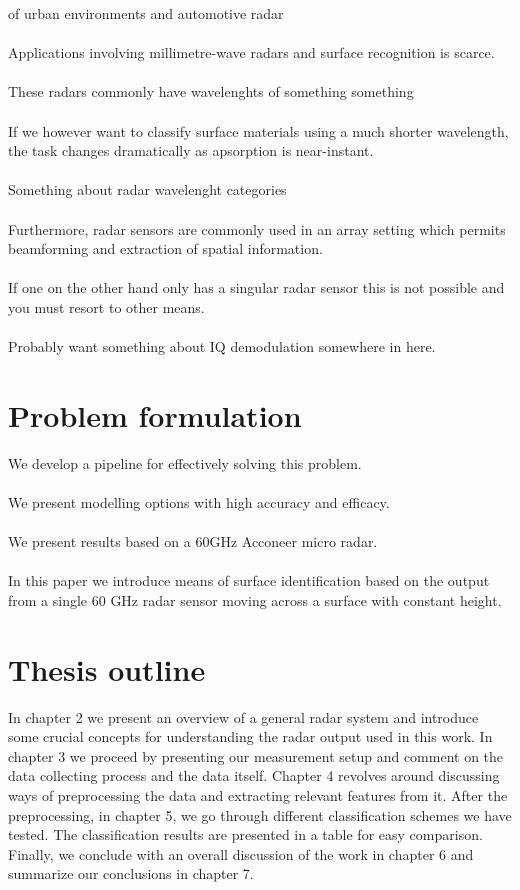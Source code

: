  of urban environments and automotive radar 
\\ \\
Applications involving millimetre-wave radars and surface recognition is scarce.  
\\ \\
These radars commonly have wavelenghts of something something
\\ \\
If we however want to classify surface materials using a much shorter wavelength, the task changes dramatically as apsorption is near-instant. 
\\ \\
Something about radar wavelenght categories
\\ \\
Furthermore, radar sensors are commonly used in an array setting which permits beamforming and extraction of spatial information. 
\\ \\
If one on the other hand only has a singular radar sensor this is not possible and you must resort to other means.
\\ \\
Probably want something about IQ demodulation somewhere in here.

\section{Problem formulation}

We develop a pipeline for effectively solving this problem. 
\\ \\
We present modelling options with high accuracy and efficacy. 
\\ \\ 
We present results based on a 60GHz Acconeer micro radar. 
\\ \\
In this paper we introduce means of surface identification based on the output from a single 60 GHz radar sensor moving across a surface with constant height. 

\section{Thesis outline}

In chapter 2 we present an overview of a general radar system and introduce some crucial concepts for understanding the radar output used in this work. In chapter 3 we proceed by presenting our measurement setup and comment on the data collecting process and the data itself. Chapter 4 revolves around discussing ways of preprocessing the data and extracting relevant features from it. After the preprocessing, in chapter 5, we go through different classification schemes we have tested. The classification results are presented in a table for easy comparison. Finally, we conclude with an overall discussion of the work in chapter 6 and summarize our conclusions in chapter 7.

